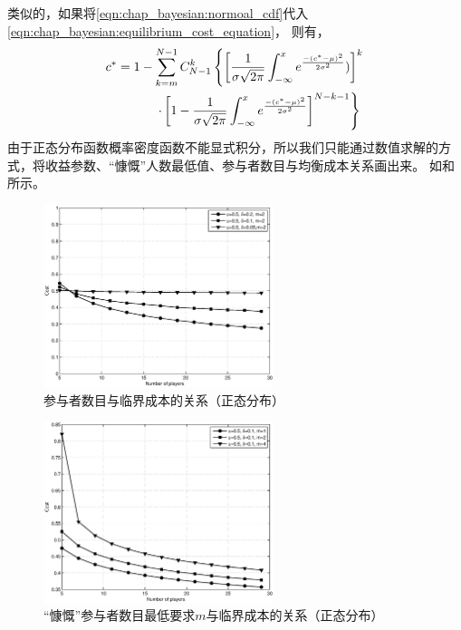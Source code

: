 类似的，如果将\eqref{eqn:chap_bayesian:normoal_cdf}代入\eqref{eqn:chap_bayesian:equilibrium_cost_equation}，
则有，
\begin{align} 
    c^* &= 1- \sum_{k=m}^{N-1}C_{N-1}^k \left\{\left[ \frac{1}{\sigma \sqrt{2\pi} } \int^x_{-\infty}e^{ \frac{-(c^*-\mu)^2}{2\sigma^2}})\right]^k \right. \notag \\
    & \qquad \left. \quad \cdot \left[1- \frac{1}{\sigma \sqrt{2\pi} } \int^x_{-\infty}e^{ \frac{-(c^*-\mu)^2}{2\sigma^2}}\right]^{N-k-1} \right\}
     \label{eqn:chap_bayesian:cost_normal_distribution_equation}
\end{align}
由于正态分布函数概率密度函数不能显式积分，所以我们只能通过数值求解的方式，将收益参数、“慷慨”人数最低值、参与者数目与均衡成本关系画出来。
如和所示。
\begin{figure}[tb]
\begin{centering}
\includegraphics[width=0.6\textwidth]{bayesian_normal_user_number_vs_contribute_probability.eps}
\caption{参与者数目与临界成本的关系（正态分布）}
\label{fig:bayesian_normal_user_numb_vs_contr_prob}
\end{centering}
\end{figure}
\begin{figure}[!tb]
\begin{centering}
\includegraphics[width=0.6\textwidth]{bayesian_normal_punish_parameter_vs_contribute_probability.eps}
\caption{“慷慨”参与者数目最低要求$m$与临界成本的关系（正态分布）}
\label{fig:bayesian_normal_puni_para_vs_cont_prob}
\end{centering}
\end{figure}

